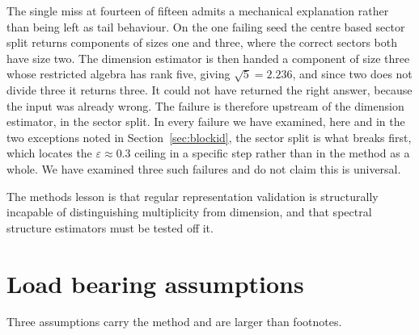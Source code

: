 \documentclass[10pt,a4paper]{amsart}
\begin{document}
The single miss at fourteen of fifteen admits a mechanical explanation rather
than being left as tail behaviour. On the one failing seed the centre based
sector split returns components of sizes one and three, where the correct sectors
both have size two. The dimension estimator is then handed a component of size
three whose restricted algebra has rank five, giving $\sqrt5=2.236$, and since
two does not divide three it returns three. It could not have returned the right
answer, because the input was already wrong. The failure is therefore upstream of
the dimension estimator, in the sector split. In every failure we have examined,
here and in the two exceptions noted in Section~\ref{sec:blockid}, the sector
split is what breaks first, which locates the $\varepsilon\approx0.3$ ceiling in
a specific step rather than in the method as a whole. We have examined three such
failures and do not claim this is universal.

The methods lesson is that regular representation validation is structurally
incapable of distinguishing multiplicity from dimension, and that spectral
structure estimators must be tested off it.

\section{Load bearing assumptions}\label{sec:assumptions}
Three assumptions carry the method and are larger than footnotes.
\end{document}
